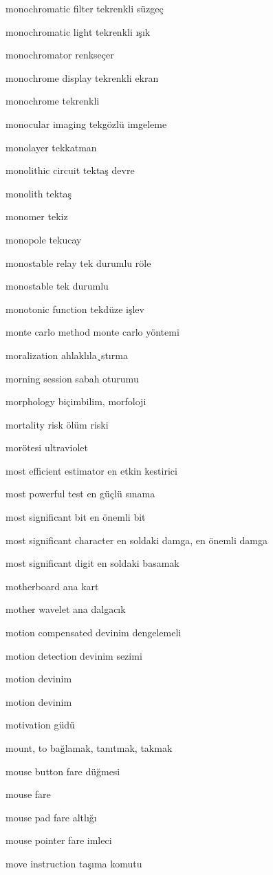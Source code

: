\documentclass[12pt,fleqn]{article}\usepackage{../../common}
\begin{document}
monochromatic filter tekrenkli süzgeç

monochromatic light tekrenkli ışık

monochromator renkseçer

monochrome display tekrenkli ekran

monochrome tekrenkli

monocular imaging tekgözlü imgeleme

monolayer tekkatman

monolithic circuit tektaş devre

monolith tektaş

monomer tekiz

monopole tekucay

monostable relay tek durumlu röle

monostable tek durumlu

monotonic function tekdüze işlev

monte carlo method monte carlo yöntemi

moralization ahlaklıla¸stırma

morning session sabah oturumu

morphology biçimbilim, morfoloji

mortality risk ölüm riski

morötesi ultraviolet

most efficient estimator en etkin kestirici

most powerful test en güçlü sınama

most significant bit en önemli bit

most significant character en soldaki damga, en önemli damga

most significant digit en soldaki basamak

motherboard ana kart

mother wavelet ana dalgacık

motion compensated devinim dengelemeli

motion detection devinim sezimi

motion devinim

motion devinim

motivation güdü

mount, to bağlamak, tanıtmak, takmak

mouse button fare düğmesi

mouse fare

mouse pad fare altlığı

mouse pointer fare imleci

move instruction taşıma komutu
\end{document}
